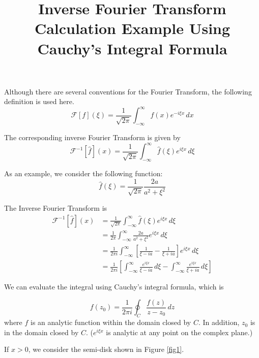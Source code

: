 \documentclass[letterpaper, 12pt]{article}
\title{Inverse Fourier Transform Calculation Example Using Cauchy's Integral Formula}
\date{}
\theoremstyle{custom}
\begin{document}
\maketitle
Although there are several conventions for the Fourier Transform, the following definition is used here.
\begin{equation*}
  \mathcal{F}\left[ f \right] \left( \xi \right) = \frac{1}{\sqrt{2 \pi}} \int_{-\infty}^{\infty} f(x) e^{-i\xi x} \, dx
\end{equation*}

The corresponding inverse Fourier Transform is given by
\begin{equation*}
  \mathcal{F}^{-1}  \left[ \hat{f} \right] \left( x \right) = \frac{1}{\sqrt{2 \pi}} \int_{-\infty}^{\infty} \hat{f}(\xi) e^{i\xi x} \, d\xi
\end{equation*}

As an example, we consider the following function:
\begin{equation*}
  \hat{f}(\xi)  = \frac{1}{\sqrt{2 \pi}} \frac{2a}{a^2+\xi^2}
\end{equation*}

The Inverse Fourier Transform is
\begin{align*}
  \mathcal{F}^{-1}  \left[ \hat{f} \right] \left( x \right) 
  &= \frac{1}{\sqrt{2 \pi}} \int_{-\infty}^{\infty} \hat{f}(\xi) e^{i\xi x} \, d\xi \\
  &= \frac{1}{2 \pi} \int_{-\infty}^{\infty} \frac{2a}{a^2+\xi^2} e^{i\xi x} \, d\xi \\
  &= \frac{1}{2 \pi i} \int_{-\infty}^{\infty} \left[  \frac{1}{\xi-ia} - \frac{1}{\xi+ia}  \right]e^{i\xi x}\, d\xi \\
  &= \frac{1}{2 \pi i} \left[ \int_{-\infty}^{\infty} \frac{e^{i\xi x}}{\xi-ia} \, d\xi -  \int_{-\infty}^{\infty} \frac{e^{i\xi x}}{\xi+ia} \, d\xi \right]
\end{align*}

We can evaluate the integral using Cauchy's integral formula, which is

\begin{equation*}
  f(z_0) = \frac{1}{2 \pi i} \oint_C \frac{f(z)}{z-z_0} \, dz
\end{equation*}
where $f$ is an analytic function within the domain closed by $C$. In addition, $z_0$ is in the domain closed by $C$.
($e^{i\xi x}$ is analytic at any point on the complex plane.)

If $x>0$, we consider the semi-disk shown in Figure \ref{fig1}.
\end{document}
